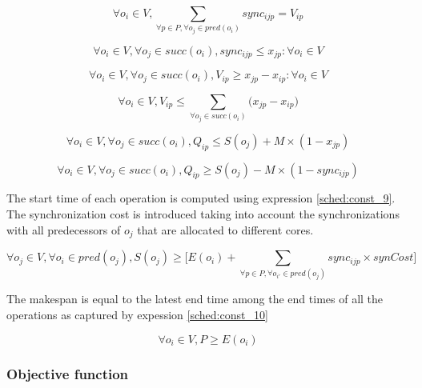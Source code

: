 \begin{equation}
\forall o_i \in V, \sum_{\forall p \in P, \forall o_j \in pred(o_i)}sync_{ijp}= V_{ip}
\label{sched:const_3}
\end{equation}

\begin{equation}
\forall o_i \in V, \forall o_j \in succ(o_i), sync_{ijp} \leq x_{jp}: \forall o_i \in V
\label{sched:const_4}
\end{equation}

\begin{equation}
\forall o_i \in V, \forall o_j \in succ(o_i), V_{ip} \geq x_{jp} - x_{ip}: \forall o_i \in V
\label{sched:const_5}
\end{equation}

\begin{equation}
 \forall o_i \in V, V_{ip} \leq \sum_{\forall o_j \in succ(o_i)}\big(x_{jp} - x_{ip}\big)
\label{sched:const_6}
\end{equation}

\begin{equation}
\forall o_i \in V, \forall o_j \in succ(o_i), Q_{ip} \leq S(o_j) + M \times (1-x_{jp})
\label{sched:const_7}
\end{equation}

\begin{equation}
\forall o_i \in V, \forall o_j \in succ(o_i), Q_{ip} \geq S(o_j) - M \times (1-sync_{ijp})
\label{sched:const_8}
\end{equation}

The start time of each operation is computed using expression \ref{sched:const_9}. The synchronization cost is introduced taking into account the synchronizations with all predecessors of $o_j$ that are allocated to different cores. 

\begin{equation}
\forall o_j \in V, \forall o_i \in pred(o_j), S(o_j) \geq \Big[E(o_i) + \sum_{\forall p \in P, \forall o_{i'} \in pred(o_j)}sync_{ijp}\times synCost\Big]
\label{sched:const_9}
\end{equation}

The makespan is equal to the latest end time among the end times of all the operations as captured by expession \ref{sched:const_10}

\begin{equation}
\forall o_i \in V, P \geq E(o_i) 
\label{sched:const_10}
\end{equation}

\subsubsection{Objective function}

